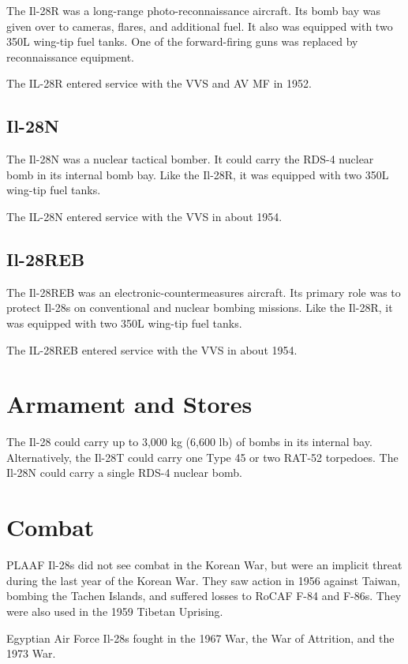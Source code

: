 The Il-28R was a long-range photo-reconnaissance aircraft. Its bomb bay was given over to cameras, flares, and additional fuel. It also was equipped with two 350L wing-tip fuel tanks. One of the forward-firing guns was replaced by reconnaissance equipment.

The IL-28R entered service with the VVS and AV MF in 1952.

\subsection{Il-28N}

The Il-28N was a nuclear tactical bomber. It could carry the RDS-4 nuclear bomb in its internal bomb bay. Like the Il-28R, it was equipped with two 350L wing-tip fuel tanks.

The IL-28N entered service with the VVS in about 1954.

\subsection{Il-28REB}

The Il-28REB was an electronic-countermeasures aircraft. Its primary role was to protect Il-28s on conventional and nuclear bombing missions. Like the Il-28R, it was equipped with two 350L wing-tip fuel tanks.

The IL-28REB entered service with the VVS in about 1954.

\section{Armament and Stores}

The Il-28 could carry up to 3,000 kg (6,600 lb) of bombs in its internal bay. Alternatively, the Il-28T could carry one Type 45 or two RAT-52 torpedoes. The Il-28N could carry a single RDS-4 nuclear bomb.

\section{Combat}

PLAAF Il-28s did not see combat in the Korean War, but were an implicit threat during the last year of the Korean War. They saw action in 1956 against Taiwan, bombing the Tachen Islands, and suffered losses to RoCAF F-84 and F-86s. They were also used in the 1959 Tibetan Uprising.

Egyptian Air Force Il-28s fought in the 1967 War, the War of Attrition, and the 1973 War.

